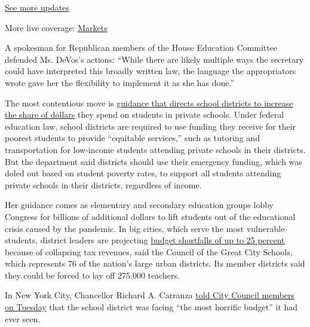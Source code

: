 \href{https://www.nytimes.com/2020/08/04/world/coronavirus-cases.html?action=click\&pgtype=Article\&state=default\&region=MAIN_CONTENT_1\&context=storylines_live_updates}{See
more updates}

More live coverage:
\href{https://www.nytimes.com/live/2020/08/04/business/stock-market-today-coronavirus?action=click\&pgtype=Article\&state=default\&region=MAIN_CONTENT_1\&context=storylines_live_updates}{Markets}

A spokesman for Republican members of the House Education Committee
defended Ms. DeVos's actions: ``While there are likely multiple ways the
secretary could have interpreted this broadly written law, the language
the appropriators wrote gave her the flexibility to implement it as she
has done.''

The most contentious move is
\href{https://www.chalkbeat.org/2020/5/5/21248179/equitable-services-coronavirus-private-schools}{guidance
that directs school districts to increase the share of dollars} they
spend on students in private schools. Under federal education law,
school districts are required to use funding they receive for their
poorest students to provide ``equitable services,'' such as tutoring and
transportation for low-income students attending private schools in
their districts. But the department said districts should use their
emergency funding, which was doled out based on student poverty rates,
to support all students attending private schools in their districts,
regardless of income.

Her guidance comes as elementary and secondary education groups lobby
Congress for billions of additional dollars to lift students out of the
educational crisis caused by the pandemic. In big cities, which serve
the most vulnerable students, district leaders are projecting
\href{https://www.politico.com/states/new-york/albany/story/2020/05/12/carranza-city-is-facing-most-horrific-budget-this-school-system-has-ever-seen-1283528}{budget
shortfalls of up to 25 percent} because of collapsing tax revenues, said
the Council of the Great City Schools, which represents 76 of the
nation's large urban districts. Its member districts said they could be
forced to lay off 275,000 teachers.

In New York City, Chancellor Richard A. Carranza
\href{https://ny.chalkbeat.org/2020/5/12/21256562/nyc-education-department-state-budget-cuts}{told
City Council members on Tuesday} that the school district was facing
``the most horrific budget'' it had ever seen.


